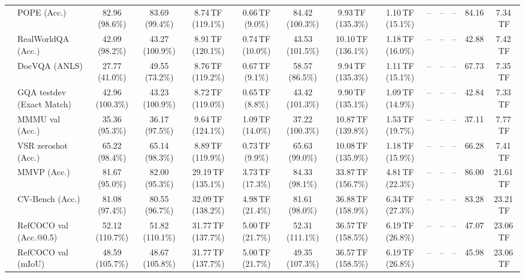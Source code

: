 \begin{table}[t]
\begin{center}
\begin{small}
\begin{sc}
{\begin{tabular}{llcccccccccccc}
& POPE (Acc.) & 82.96 (98.6\%) & 83.69 (99.4\%) & 8.74\,TF (119.1\%) & 0.66\,TF (9.0\%) & 84.42 (100.3\%) & 9.93\,TF (135.3\%) & 1.10\,TF (15.1\%) & -- & -- & -- & 84.16 & 7.34\,TF \\
& RealWorldQA (Acc.) & 42.09 (98.2\%) & 43.27 (100.9\%) & 8.91\,TF (120.1\%) & 0.74\,TF (10.0\%) & 43.53 (101.5\%) & 10.10\,TF (136.1\%) & 1.18\,TF (16.0\%) & -- & -- & -- & 42.88 & 7.42\,TF \\
& DocVQA (ANLS) & 27.77 (41.0\%) & 49.55 (73.2\%) & 8.76\,TF (119.2\%) & 0.67\,TF (9.1\%) & 58.57 (86.5\%) & 9.94\,TF (135.3\%) & 1.11\,TF (15.1\%) & -- & -- & -- & 67.73 & 7.35\,TF \\
& GQA testdev (Exact Match) & 42.96 (100.3\%) & 43.23 (100.9\%) & 8.72\,TF (119.0\%) & 0.65\,TF (8.8\%) & 43.42 (101.3\%) & 9.90\,TF (135.1\%) & 1.09\,TF (14.9\%) & -- & -- & -- & 42.84 & 7.33\,TF \\
& MMMU val (Acc.) & 35.36 (95.3\%) & 36.17 (97.5\%) & 9.64\,TF (124.1\%) & 1.09\,TF (14.0\%) & 37.22 (100.3\%) & 10.87\,TF (139.8\%) & 1.53\,TF (19.7\%) & -- & -- & -- & 37.11 & 7.77\,TF \\
& VSR zeroshot (Acc.) & 65.22 (98.4\%) & 65.14 (98.3\%) & 8.89\,TF (119.9\%) & 0.73\,TF (9.9\%) & 65.63 (99.0\%) & 10.08\,TF (135.9\%) & 1.18\,TF (15.9\%) & -- & -- & -- & 66.28 & 7.41\,TF \\
\midrule
{}
& MMVP (Acc.) & 81.67 (95.0\%) & 82.00 (95.3\%) & 29.19\,TF (135.1\%) & 3.73\,TF (17.3\%) & 84.33 (98.1\%) & 33.87\,TF (156.7\%) & 4.81\,TF (22.3\%) & -- & -- & -- & 86.00 & 21.61\,TF \\
& CV-Bench (Acc.) & 81.08 (97.4\%) & 80.55 (96.7\%) & 32.09\,TF (138.2\%) & 4.98\,TF (21.4\%) & 81.61 (98.0\%) & 36.88\,TF (158.9\%) & 6.34\,TF (27.3\%) & -- & -- & -- & 83.28 & 23.21\,TF \\
& RefCOCO val (Acc.@0.5) & 52.12 (110.7\%) & 51.82 (110.1\%) & 31.77\,TF (137.7\%) & 5.00\,TF (21.7\%) & 52.31 (111.1\%) & 36.57\,TF (158.5\%) & 6.19\,TF (26.8\%) & -- & -- & -- & 47.07 & 23.06\,TF \\
& RefCOCO val (mIoU) & 48.59 (105.7\%) & 48.67 (105.8\%) & 31.77\,TF (137.7\%) & 5.00\,TF (21.7\%) & 49.35 (107.3\%) & 36.57\,TF (158.5\%) & 6.19\,TF (26.8\%) & -- & -- & -- & 45.98 & 23.06\,TF \\

\end{tabular}}
\end{sc}
\end{small}
\end{center}
\end{table}
